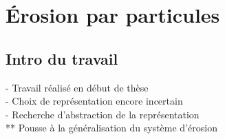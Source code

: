 \graphicspath{ {./figures/} }

\chapter{Érosion par particules}
\minitoc

\section{Intro du travail}
- Travail réalisé en début de thèse \\
- Choix de représentation encore incertain \\
- Recherche d'abstraction de la représentation \\
** Pousse à la généralisation du système d'érosion



\newcommand{\referenceExemple}[1] {\textit{Figure~\ref{tab:result_figures}: #1}}





\newcommand{\addingFiguresToCell}[4]{%
        \texttt{[image: \#1]}
        \texttt{[image: \#2]}
        \ifx\relax#3\relax
        \else
            \texttt{[image: \#3]}
        \fi
        \ifx\relax#4\relax
        \else
            \texttt{[image: \#4]}
        \fi
}

